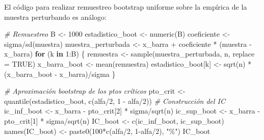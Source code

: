 \documentclass[
]{book}
\newenvironment{Shaded}{\begin{snugshade}}{\end{snugshade}}
\newcommand{\AttributeTok}[1]{\textcolor[rgb]{0.77,0.63,0.00}{#1}}
\newcommand{\CommentTok}[1]{\textcolor[rgb]{0.56,0.35,0.01}{\textit{#1}}}
\newcommand{\ConstantTok}[1]{\textcolor[rgb]{0.00,0.00,0.00}{#1}}
\newcommand{\ControlFlowTok}[1]{\textcolor[rgb]{0.13,0.29,0.53}{\textbf{#1}}}
\newcommand{\DecValTok}[1]{\textcolor[rgb]{0.00,0.00,0.81}{#1}}
\newcommand{\FunctionTok}[1]{\textcolor[rgb]{0.00,0.00,0.00}{#1}}
\newcommand{\NormalTok}[1]{#1}
\newcommand{\OtherTok}[1]{\textcolor[rgb]{0.56,0.35,0.01}{#1}}
\newcommand{\SpecialCharTok}[1]{\textcolor[rgb]{0.00,0.00,0.00}{#1}}
\newcommand{\StringTok}[1]{\textcolor[rgb]{0.31,0.60,0.02}{#1}}
\theoremstyle{break}
\theoremstyle{definition}
\theoremstyle{definition}
\theoremstyle{definition}
\theoremstyle{definition}
\theoremstyle{remark}
\begin{document}
El código para realizar remuestreo bootstrap uniforme sobre la empírica de la
muestra perturbando es análogo:

\begin{Shaded}
\begin{Highlighting}[]
\CommentTok{\# Remuestreo}
\NormalTok{B }\OtherTok{\textless{}{-}} \DecValTok{1000}
\NormalTok{estadistico\_boot }\OtherTok{\textless{}{-}} \FunctionTok{numeric}\NormalTok{(B)}
\NormalTok{coeficiente }\OtherTok{\textless{}{-}}\NormalTok{ sigma}\SpecialCharTok{/}\FunctionTok{sd}\NormalTok{(muestra)}
\NormalTok{muestra\_perturbada }\OtherTok{\textless{}{-}}\NormalTok{ x\_barra }\SpecialCharTok{+}\NormalTok{ coeficiente }\SpecialCharTok{*}\NormalTok{ (muestra }\SpecialCharTok{{-}}\NormalTok{ x\_barra)}
\ControlFlowTok{for}\NormalTok{ (k }\ControlFlowTok{in} \DecValTok{1}\SpecialCharTok{:}\NormalTok{B) \{}
\NormalTok{  remuestra }\OtherTok{\textless{}{-}} \FunctionTok{sample}\NormalTok{(muestra\_perturbada, n, }\AttributeTok{replace =} \ConstantTok{TRUE}\NormalTok{)}
\NormalTok{  x\_barra\_boot }\OtherTok{\textless{}{-}} \FunctionTok{mean}\NormalTok{(remuestra)}
\NormalTok{  estadistico\_boot[k] }\OtherTok{\textless{}{-}} \FunctionTok{sqrt}\NormalTok{(n) }\SpecialCharTok{*}\NormalTok{ (x\_barra\_boot }\SpecialCharTok{{-}}\NormalTok{ x\_barra)}\SpecialCharTok{/}\NormalTok{sigma}
\NormalTok{\}}

\CommentTok{\# Aproximación bootstrap de los ptos críticos}
\NormalTok{pto\_crit }\OtherTok{\textless{}{-}} \FunctionTok{quantile}\NormalTok{(estadistico\_boot, }\FunctionTok{c}\NormalTok{(alfa}\SpecialCharTok{/}\DecValTok{2}\NormalTok{, }\DecValTok{1} \SpecialCharTok{{-}}\NormalTok{ alfa}\SpecialCharTok{/}\DecValTok{2}\NormalTok{))}
\CommentTok{\# Construcción del IC}
\NormalTok{ic\_inf\_boot }\OtherTok{\textless{}{-}}\NormalTok{ x\_barra }\SpecialCharTok{{-}}\NormalTok{ pto\_crit[}\DecValTok{2}\NormalTok{] }\SpecialCharTok{*}\NormalTok{ sigma}\SpecialCharTok{/}\FunctionTok{sqrt}\NormalTok{(n)}
\NormalTok{ic\_sup\_boot }\OtherTok{\textless{}{-}}\NormalTok{ x\_barra }\SpecialCharTok{{-}}\NormalTok{ pto\_crit[}\DecValTok{1}\NormalTok{] }\SpecialCharTok{*}\NormalTok{ sigma}\SpecialCharTok{/}\FunctionTok{sqrt}\NormalTok{(n)}
\NormalTok{IC\_boot }\OtherTok{\textless{}{-}} \FunctionTok{c}\NormalTok{(ic\_inf\_boot, ic\_sup\_boot)}
\FunctionTok{names}\NormalTok{(IC\_boot) }\OtherTok{\textless{}{-}} \FunctionTok{paste0}\NormalTok{(}\DecValTok{100}\SpecialCharTok{*}\FunctionTok{c}\NormalTok{(alfa}\SpecialCharTok{/}\DecValTok{2}\NormalTok{, }\DecValTok{1}\SpecialCharTok{{-}}\NormalTok{alfa}\SpecialCharTok{/}\DecValTok{2}\NormalTok{), }\StringTok{"\%"}\NormalTok{)}
\NormalTok{IC\_boot}
\end{Highlighting}
\end{Shaded}
\end{document}
